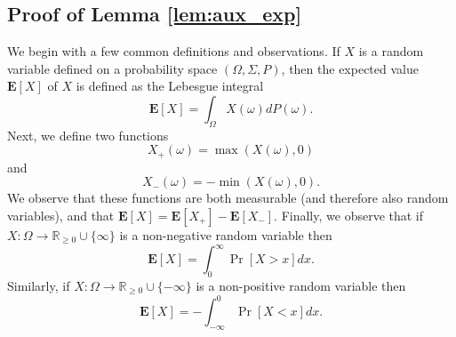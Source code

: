 \documentclass[final,12pt]{colt2018}
\newtheorem{informal theorem}[theorem]{Theorem (informal statement)}
\newcommand{\R}{\mathbb{R}}
\newcommand{\E}{\mathbf{E}}
\begin{document}


\subsection{Proof of Lemma \ref{lem:aux_exp}}
We begin with a few common definitions and observations.
If $X$ is a random variable defined on a probability space $(\Omega, \Sigma, P)$, then the expected value $\E[X]$ of $X$ is defined as the Lebesgue integral
\[
\E[X] = \int_{\Omega} X(\omega)dP(\omega).
\]
Next, we define two functions 
\[
X_+(\omega) = \max(X(\omega),0)
\]
and
\[
X_-(\omega) = -\min(X(\omega),0).
\]
We observe that these functions are both measurable (and therefore also random variables), and that $\E[X] = \E[X_+] - \E[X_-]$.
Finally, we observe that if $X : \Omega \rightarrow \R_{\geq 0} \cup \{\infty\}$ is a non-negative random variable then
\[
\E[X] = \int_{0}^{\infty} \Pr[X > x] dx.
\]
Similarly, if $X : \Omega \rightarrow \R_{\geq 0} \cup \{-\infty\}$ is a non-positive random variable then
\[
\E[X] = -\int_{-\infty}^{0} \Pr[X < x] dx.
\]
\end{document}
